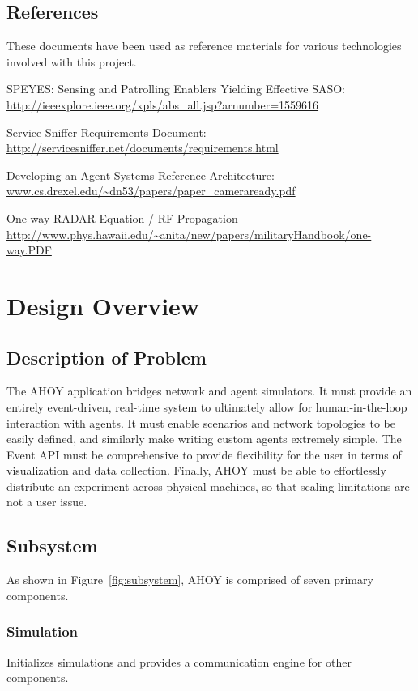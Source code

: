 \documentclass[titlepage]{article}
\renewenvironment{itemize*}
    {\begin{itemize}
        \setlength{\itemsep}{0pt}%
        \setlength{\parskip}{0pt}%
        \setlength{\partopsep}{0pt}%
        \setlength{\topsep}{0pt}}%
    {\end{itemize}}
\begin{document}
\subsection{References%
  \label{references}%
}

These documents have been used as reference materials for various technologies involved with this project.
%
\begin{itemize*}
	\item SPEYES: Sensing and Patrolling Enablers Yielding Effective SASO: \url{http://ieeexplore.ieee.org/xpls/abs_all.jsp?arnumber=1559616}
	\item Service Sniffer Requirements Document: \url{http://servicesniffer.net/documents/requirements.html}
    \item Developing an Agent Systems Reference Architecture: \url{www.cs.drexel.edu/~dn53/papers/paper_cameraready.pdf}
    \item One-way RADAR Equation / RF Propagation \url{http://www.phys.hawaii.edu/~anita/new/papers/militaryHandbook/one-way.PDF}
\end{itemize*}

\section{Design Overview}
\subsection{Description of Problem}
The AHOY application bridges network and agent simulators. It must provide an entirely event-driven, real-time system to ultimately allow for human-in-the-loop interaction with agents. It must enable scenarios and network topologies to be easily defined, and similarly make writing custom agents extremely simple. The Event API must be comprehensive to provide flexibility for the user in terms of visualization and data collection. Finally, AHOY must be able to effortlessly distribute an experiment across physical machines, so that scaling limitations are not a user issue.

\subsection{Subsystem}
As shown in Figure~\ref{fig:subsystem}, AHOY is comprised of seven primary components.

\subsubsection{Simulation}{Initializes simulations and provides a communication engine for other components.}
\end{document}

